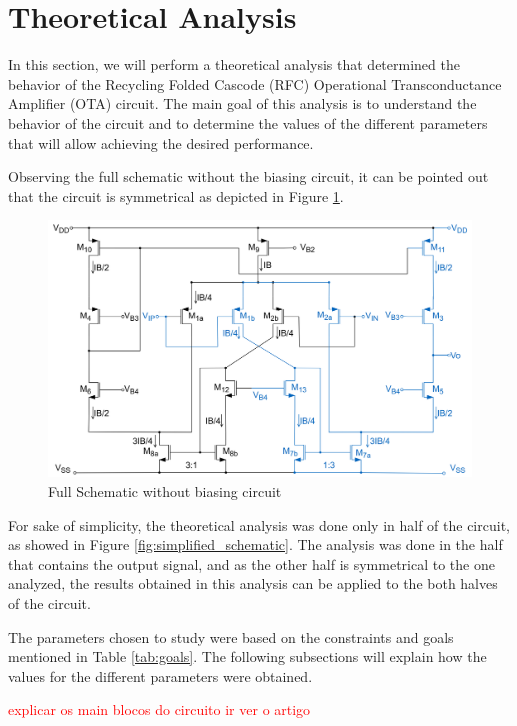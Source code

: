 \section{Theoretical Analysis}

In this section, we will perform a theoretical analysis that determined the behavior of the Recycling Folded Cascode (RFC) Operational Transconductance Amplifier (OTA) circuit. The main goal of this analysis is to understand the behavior of the circuit and to determine the values of the different parameters that will allow achieving the desired performance.

Observing the full schematic without the biasing circuit, it can be pointed out that the circuit is symmetrical as depicted in Figure \ref{fig:full_schematic}. 

\begin{figure}[H]
    \centering
    \includegraphics[width=1\textwidth]{Images/full_sch.png}
    \caption{Full Schematic without biasing circuit}
    \label{fig:full_schematic}
\end{figure}

For sake of simplicity, the theoretical analysis was done only in half of the circuit, as showed in Figure \ref{fig:simplified_schematic}. The analysis was done in the half that contains the output signal, and as the other half is symmetrical to the one analyzed, the results obtained in this analysis can be applied to the both halves of the circuit. 

The parameters chosen to study were based on the constraints and goals mentioned in Table \ref{tab:goals}. The following subsections will explain how the values for the different parameters were obtained.

\textcolor{red}{explicar os main blocos do circuito ir ver o artigo}

